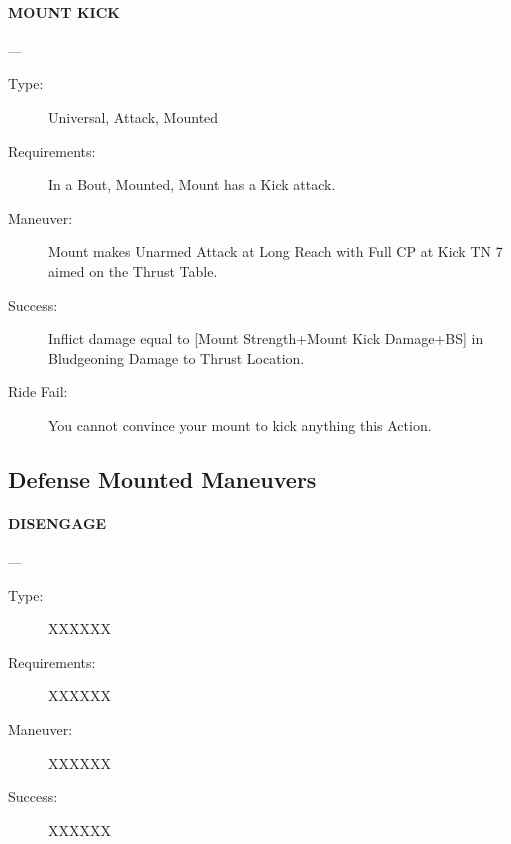\documentclass[oneside,11pt,english]{book}
\begin{document}
\paragraph{\large\label{man:MOUNT KICK} MOUNT KICK}---
\vspace{-10pt}\begin{description}
\item [Type:] Universal, Attack, Mounted 
\item [Requirements:] In a Bout, Mounted, Mount has a Kick attack. 
\item [Maneuver:] Mount makes Unarmed Attack at Long Reach with Full CP at Kick TN 7 aimed on the Thrust 
Table. 
\item [Success:] Inflict damage equal to [Mount Strength+Mount Kick Damage+BS] in Bludgeoning Damage to 
Thrust Location. 
\item [Ride Fail:] You cannot convince your mount to kick anything this Action.
\end{description}
\subsection{Defense Mounted Maneuvers}
\paragraph{\large\label{man:DISENGAGE} DISENGAGE}---\quad{\large[??????]}
\vspace{-10pt}\begin{description} 
\item [Type:] XXXXXX 
\item [Requirements:] XXXXXX 
\item [Maneuver:] XXXXXX 
\item [Success:] XXXXXX 
\end{description}
\end{document}
